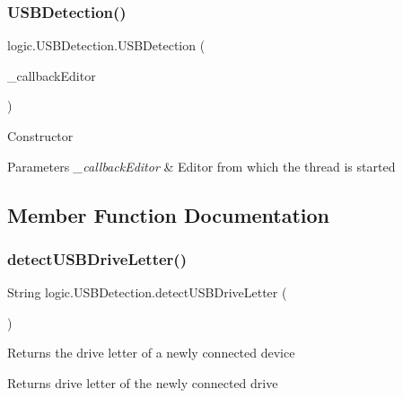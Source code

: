 \subsubsection{\texorpdfstring{U\+S\+B\+Detection()}{USBDetection()}}
{\footnotesize\ttfamily logic.\+U\+S\+B\+Detection.\+U\+S\+B\+Detection (\begin{DoxyParamCaption}\item[{\mbox{\hyperlink{classlogic_1_1_text_editor}{Text\+Editor}}}]{\+\_\+callback\+Editor }\end{DoxyParamCaption})}

Constructor 
\begin{DoxyParams}{Parameters}
{\em \+\_\+callback\+Editor} & Editor from which the thread is started \\
\hline
\end{DoxyParams}


\subsection{Member Function Documentation}
\mbox{\label{classlogic_1_1_u_s_b_detection_a1d7dc58db8f4fd4de5ba1387dc0de92b}} 
\subsubsection{\texorpdfstring{detect\+U\+S\+B\+Drive\+Letter()}{detectUSBDriveLetter()}}
{\footnotesize\ttfamily String logic.\+U\+S\+B\+Detection.\+detect\+U\+S\+B\+Drive\+Letter (\begin{DoxyParamCaption}{ }\end{DoxyParamCaption})}

Returns the drive letter of a newly connected device \begin{DoxyReturn}{Returns}
drive letter of the newly connected drive 
\end{DoxyReturn}
\mbox{\label{classlogic_1_1_u_s_b_detection_a684dad305f6e4adf0362e33bbb25d041}} 
